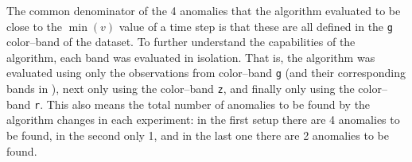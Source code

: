 The common denominator of the 4 anomalies that the \mlblink algorithm evaluated to be close to the $\min(v)$ value of a time step is that these are all defined in the \texttt{g} color--band of the \panstarrs dataset. To further understand the capabilities of the \mlblink algorithm, each \panstarrs band was evaluated in isolation. That is, the \mlblink algorithm was evaluated using only the observations from \panstarrs color--band \texttt{g} (and their corresponding bands in \usno), next only using the \panstarrs color--band \texttt{z}, and finally only using the \panstarrs color--band \texttt{r}. This also means the total number of anomalies to be found by the algorithm changes in each experiment: in the first setup there are 4 anomalies to be found, in the second only 1, and in the last one there are 2 anomalies to be found.